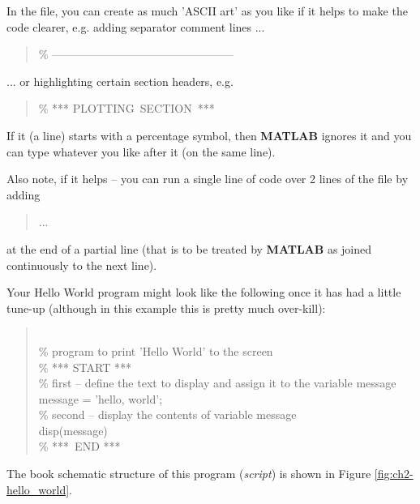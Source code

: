 \documentclass{tufte-book} %
\newenvironment{docspec}{\begin{quotation}\ttfamily\parskip0pt\parindent0pt\ignorespaces}{\end{quotation}}
\begin{document}
In the file, you can create as much 'ASCII art' as you like if it helps to make the code clearer, e.g. adding separator comment lines ...

\begin{docspec}
\textcolor[rgb]{0,0.501961,0}{\% ------------------------------------------------}
\end{docspec} 

... or highlighting certain section headers, e.g.

\begin{docspec}
\textcolor[rgb]{0,0.501961,0}{\% *** PLOTTING\ SECTION\ ***}
\end{docspec}

\noindent If it (a line) starts with a percentage symbol, then \textbf{MATLAB} ignores it and you can type whatever you like after it (on the same line).

\noindent Also note, if it helps -- you can run a single line of code over 2 lines of the file by adding

\begin{docspec}
...
\end{docspec}

\noindent at the end of a partial line (that is to be treated by \textbf{MATLAB} as joined continuously to the next line).

Your \textsf{Hello World} program might look like the following once it has had a little tune-up (although in this example this is pretty much over-kill):
\begin{docspec}
\textcolor[rgb]{0,0.501961,0}{\\\% program to print 'Hello World' to the screen
\\\% *** START ***
\\\% first -- define the text to display and assign it to the variable  message}
\\message = 'hello, world';
\textcolor[rgb]{0,0.501961,0}{\\\% second -- display the contents of variable message}
\\disp(message)
\textcolor[rgb]{0,0.501961,0}{\\\% ***\ END ***}
\end{docspec}

The book schematic structure of this program (\textit{script}) is shown in Figure \ref{fig:ch2-hello_world}.
\end{document}
